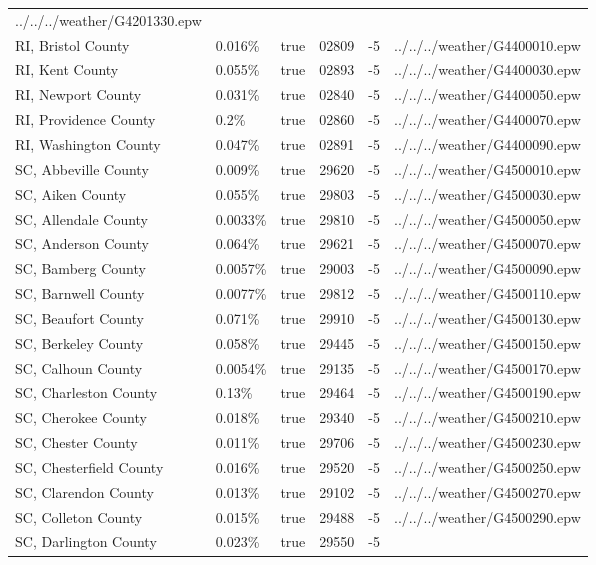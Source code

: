 \begin{longtable}[]{@{}llllll@{}}
../../../weather/G4201330.epw \\
RI, Bristol County & 0.016\% & true & 02809 & -5 &
../../../weather/G4400010.epw \\
RI, Kent County & 0.055\% & true & 02893 & -5 &
../../../weather/G4400030.epw \\
RI, Newport County & 0.031\% & true & 02840 & -5 &
../../../weather/G4400050.epw \\
RI, Providence County & 0.2\% & true & 02860 & -5 &
../../../weather/G4400070.epw \\
RI, Washington County & 0.047\% & true & 02891 & -5 &
../../../weather/G4400090.epw \\
SC, Abbeville County & 0.009\% & true & 29620 & -5 &
../../../weather/G4500010.epw \\
SC, Aiken County & 0.055\% & true & 29803 & -5 &
../../../weather/G4500030.epw \\
SC, Allendale County & 0.0033\% & true & 29810 & -5 &
../../../weather/G4500050.epw \\
SC, Anderson County & 0.064\% & true & 29621 & -5 &
../../../weather/G4500070.epw \\
SC, Bamberg County & 0.0057\% & true & 29003 & -5 &
../../../weather/G4500090.epw \\
SC, Barnwell County & 0.0077\% & true & 29812 & -5 &
../../../weather/G4500110.epw \\
SC, Beaufort County & 0.071\% & true & 29910 & -5 &
../../../weather/G4500130.epw \\
SC, Berkeley County & 0.058\% & true & 29445 & -5 &
../../../weather/G4500150.epw \\
SC, Calhoun County & 0.0054\% & true & 29135 & -5 &
../../../weather/G4500170.epw \\
SC, Charleston County & 0.13\% & true & 29464 & -5 &
../../../weather/G4500190.epw \\
SC, Cherokee County & 0.018\% & true & 29340 & -5 &
../../../weather/G4500210.epw \\
SC, Chester County & 0.011\% & true & 29706 & -5 &
../../../weather/G4500230.epw \\
SC, Chesterfield County & 0.016\% & true & 29520 & -5 &
../../../weather/G4500250.epw \\
SC, Clarendon County & 0.013\% & true & 29102 & -5 &
../../../weather/G4500270.epw \\
SC, Colleton County & 0.015\% & true & 29488 & -5 &
../../../weather/G4500290.epw \\
SC, Darlington County & 0.023\% & true & 29550 & -5 &

\end{longtable}
